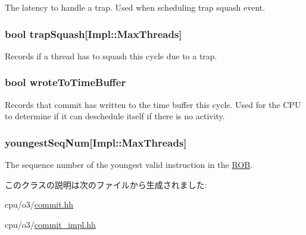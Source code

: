 \label{classDefaultCommit_a0bfffaa2e5f9c7e79353e61146950a9a}
The latency to handle a trap. Used when scheduling trap squash event. \hypertarget{classDefaultCommit_af3547420a792f13034730b5f327a47ff}{
\subsubsection[{trapSquash}]{\setlength{\rightskip}{0pt plus 5cm}bool {\bf trapSquash}\mbox{[}Impl::MaxThreads\mbox{]}}}
\label{classDefaultCommit_af3547420a792f13034730b5f327a47ff}
Records if a thread has to squash this cycle due to a trap. \hypertarget{classDefaultCommit_a2c7e870d4babdac0dc91fc7ffabd0f3d}{
\subsubsection[{wroteToTimeBuffer}]{\setlength{\rightskip}{0pt plus 5cm}bool {\bf wroteToTimeBuffer}}}
\label{classDefaultCommit_a2c7e870d4babdac0dc91fc7ffabd0f3d}
Records that commit has written to the time buffer this cycle. Used for the CPU to determine if it can deschedule itself if there is no activity. \hypertarget{classDefaultCommit_a1d81dc5c05e15057c1985acc39285540}{
\subsubsection[{youngestSeqNum}]{ {\bf youngestSeqNum}\mbox{[}Impl::MaxThreads\mbox{]}}}
\label{classDefaultCommit_a1d81dc5c05e15057c1985acc39285540}
The sequence number of the youngest valid instruction in the \hyperlink{classROB}{ROB}. 

このクラスの説明は次のファイルから生成されました:\begin{DoxyCompactItemize}
\item 
cpu/o3/\hyperlink{commit_8hh}{commit.hh}\item 
cpu/o3/\hyperlink{commit__impl_8hh}{commit\_\-impl.hh}\end{DoxyCompactItemize}
